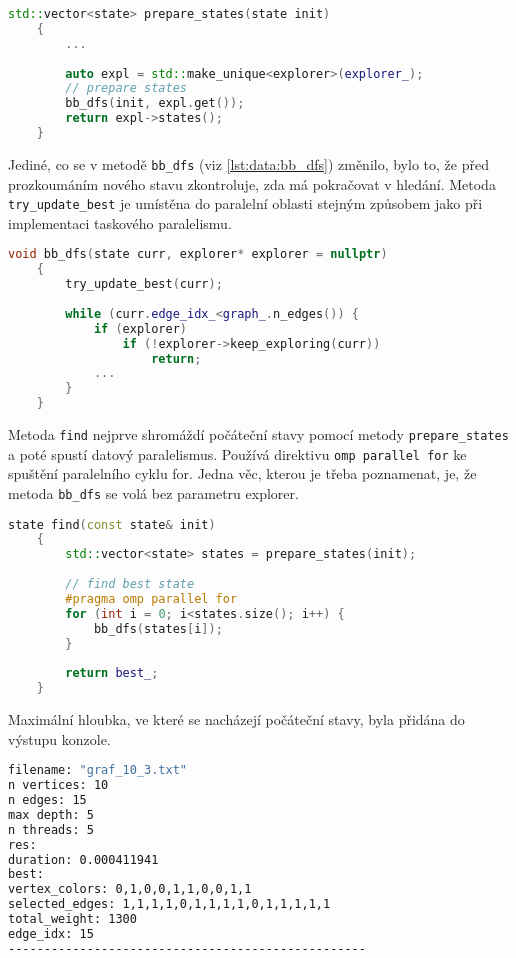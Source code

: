 \begin{lstlisting}[language=C++, label={lst:data:prepare_states}, title={Metoda pro přípravu počátečních stavů}]
    std::vector<state> prepare_states(state init)
    {
        ...
    
        auto expl = std::make_unique<explorer>(explorer_);
        // prepare states
        bb_dfs(init, expl.get());
        return expl->states();
    }
\end{lstlisting}

Jediné, co se v metodě \texttt{bb\_dfs} (viz \ref{lst:data:bb_dfs}) změnilo, bylo to, že před prozkoumáním nového stavu zkontroluje, zda má pokračovat v hledání.
Metoda \texttt{try\_update\_best} je umístěna do paralelní oblasti stejným způsobem jako při implementaci taskového paralelismu.

\begin{lstlisting}[language=C++, label={lst:data:bb_dfs}, title={Metoda pro prohledávání stavového prostoru}]
    void bb_dfs(state curr, explorer* explorer = nullptr)
    {
        try_update_best(curr);
        
        while (curr.edge_idx_<graph_.n_edges()) {
            if (explorer)
                if (!explorer->keep_exploring(curr))
                    return;
            ...
        }
    }
\end{lstlisting}

Metoda \texttt{find} nejprve shromáždí počáteční stavy pomocí metody \texttt{prepare\_states} a poté spustí datový paralelismus.
Používá direktivu \texttt{omp parallel for} ke spuštění paralelního cyklu for.
Jedna věc, kterou je třeba poznamenat, je, že metoda \texttt{bb\_dfs} se volá bez parametru explorer.

\begin{lstlisting}[language=C++, label={lst:data:find}, title={Metoda pro nalezení nejlepšího stavu}]
    state find(const state& init)
    {
        std::vector<state> states = prepare_states(init);
    
        // find best state
        #pragma omp parallel for
        for (int i = 0; i<states.size(); i++) {
            bb_dfs(states[i]);
        }
    
        return best_;
    }
\end{lstlisting}

Maximální hloubka, ve které se nacházejí počáteční stavy, byla přidána do výstupu konzole.

\begin{lstlisting}[language=bash, label={lst:data:console_log}, title={Příklad výpisu výsledků}]
filename: "graf_10_3.txt"
n vertices: 10
n edges: 15
max depth: 5
n threads: 5
res:
duration: 0.000411941
best:
vertex_colors: 0,1,0,0,1,1,0,0,1,1
selected_edges: 1,1,1,1,0,1,1,1,1,0,1,1,1,1,1
total_weight: 1300
edge_idx: 15
--------------------------------------------------
\end{lstlisting}









